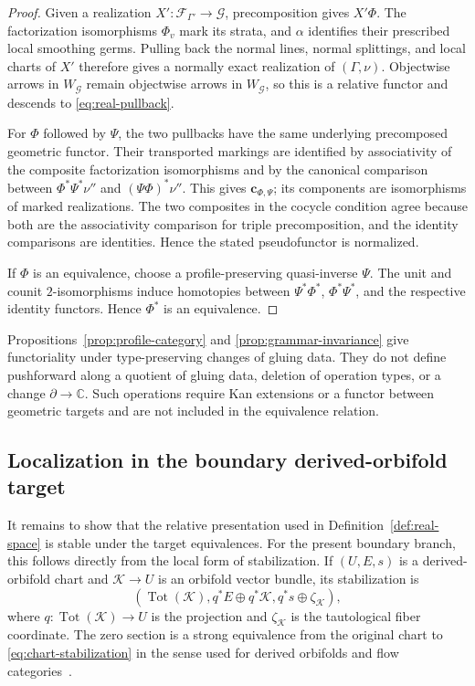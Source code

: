 \documentclass[11pt,letterpaper,twoside]{article}
\theoremstyle{plain}
\theoremstyle{definition}
\theoremstyle{remark}
\let\cite\citep
\begin{document}
\begin{proof}
Given a realization \(X':\mathcal F_{\Gamma'}\to\mathcal G\), precomposition gives \(X'\Phi\).  The factorization isomorphisms \(\Phi_v\) mark its strata, and \(\alpha\) identifies their prescribed local smoothing germs.  Pulling back the normal lines, normal splittings, and local charts of \(X'\) therefore gives a normally exact realization of \((\Gamma,\nu)\).  Objectwise arrows in \(W_{\mathcal G}\) remain objectwise arrows in \(W_{\mathcal G}\), so this is a relative functor and descends to \eqref{eq:real-pullback}.

For \(\Phi\) followed by \(\Psi\), the two pullbacks have the same underlying precomposed geometric functor.  Their transported markings are identified by associativity of the composite factorization isomorphisms and by the canonical comparison between \(\Phi^*\Psi^*\nu''\) and \((\Psi\Phi)^*\nu''\).  This gives \(\mathbf c_{\Phi,\Psi}\); its components are isomorphisms of marked realizations.  The two composites in the cocycle condition agree because both are the associativity comparison for triple precomposition, and the identity comparisons are identities.  Hence the stated pseudofunctor is normalized.

If \(\Phi\) is an equivalence, choose a profile-preserving quasi-inverse \(\Psi\).  The unit and counit \(2\)-isomorphisms induce homotopies between \(\Psi^*\Phi^*\), \(\Phi^*\Psi^*\), and the respective identity functors.  Hence \(\Phi^*\) is an equivalence.
\end{proof}

Propositions~\ref{prop:profile-category} and \ref{prop:grammar-invariance} give functoriality under type-preserving changes of gluing data.  They do not define pushforward along a quotient of gluing data, deletion of operation types, or a change \(\partial\to\mathbb C\).  Such operations require Kan extensions or a functor between geometric targets and are not included in the equivalence relation.

\subsection{Localization in the boundary derived-orbifold target}\label{sec:target-localization}

It remains to show that the relative presentation used in Definition~\ref{def:real-space} is stable under the target equivalences.  For the present boundary branch, this follows directly from the local form of stabilization.  If \((U,E,s)\) is a derived-orbifold chart and \(\mathcal K\to U\) is an orbifold vector bundle, its stabilization is
\begin{equation}\label{eq:chart-stabilization}
 \left(\operatorname{Tot}(\mathcal K),
 q^*E\oplus q^*\mathcal K,
 q^*s\oplus\zeta_{\mathcal K}\right),
\end{equation}
where \(q:\operatorname{Tot}(\mathcal K)\to U\) is the projection and \(\zeta_{\mathcal K}\) is the tautological fiber coordinate.  The zero section is a strong equivalence from the original chart to \eqref{eq:chart-stabilization} in the sense used for derived orbifolds and flow categories~\cite{abouzaidblumberg2024}.
\end{document}
